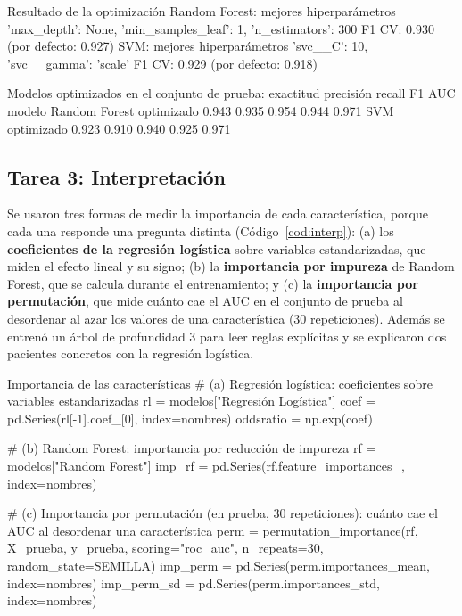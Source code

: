 \documentclass[11pt,letterpaper]{article}
\begin{document}
\begin{consola}[label=out:opt]{Resultado de la optimización}
Random Forest: mejores hiperparámetros {'max_depth': None, 'min_samples_leaf': 1, 'n_estimators': 300}
   F1 CV: 0.930 (por defecto: 0.927)
SVM: mejores hiperparámetros {'svc__C': 10, 'svc__gamma': 'scale'}
   F1 CV: 0.929 (por defecto: 0.918)

Modelos optimizados en el conjunto de prueba:
                          exactitud  precisión  recall     F1    AUC
modelo
Random Forest optimizado      0.943      0.935   0.954  0.944  0.971
SVM optimizado                0.923      0.910   0.940  0.925  0.971
\end{consola}

\subsection{Tarea 3: Interpretación}

Se usaron tres formas de medir la importancia de cada característica, porque cada una responde una pregunta distinta (Código~\ref{cod:interp}): (a) los \textbf{coeficientes de la regresión logística} sobre variables estandarizadas, que miden el efecto lineal y su signo; (b) la \textbf{importancia por impureza} de Random Forest, que se calcula durante el entrenamiento; y (c) la \textbf{importancia por permutación}, que mide cuánto cae el AUC en el conjunto de prueba al desordenar al azar los valores de una característica (30 repeticiones). Además se entrenó un árbol de profundidad 3 para leer reglas explícitas y se explicaron dos pacientes concretos con la regresión logística.

\begin{codigo}[label=cod:interp]{Importancia de las características}
# (a) Regresión logística: coeficientes sobre variables estandarizadas
rl = modelos["Regresión Logística"]
coef = pd.Series(rl[-1].coef_[0], index=nombres)
oddsratio = np.exp(coef)

# (b) Random Forest: importancia por reducción de impureza
rf = modelos["Random Forest"]
imp_rf = pd.Series(rf.feature_importances_, index=nombres)

# (c) Importancia por permutación (en prueba, 30 repeticiones): cuánto cae el AUC al desordenar una característica
perm = permutation_importance(rf, X_prueba, y_prueba, scoring="roc_auc", n_repeats=30, random_state=SEMILLA)
imp_perm = pd.Series(perm.importances_mean, index=nombres)
imp_perm_sd = pd.Series(perm.importances_std, index=nombres)
\end{codigo}
\end{document}
